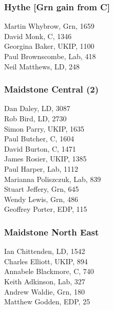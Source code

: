 \documentclass[a4paper,openany,10pt]{book}
\begin{document}
\subsubsection*{Hythe \hspace*{\fill}\nolinebreak[1]%
\enspace\hspace*{\fill}
[Grn gain from C]}



Martin Whybrow, Grn, 1659\\
David Monk, C, 1346\\
Georgina Baker, UKIP, 1100\\
Paul Brownscombe, Lab, 418\\
Neil Matthews, LD, 248\\


\subsubsection*{Maidstone Central (2)}



Dan Daley, LD, 3087\\
Rob Bird, LD, 2730\\
Simon Parry, UKIP, 1635\\
Paul Butcher, C, 1604\\
David Burton, C, 1471\\
James Rosier, UKIP, 1385\\
Paul Harper, Lab, 1112\\
Marianna Poliszczuk, Lab, 839\\
Stuart Jeffery, Grn, 645\\
Wendy Lewis, Grn, 486\\
Geoffrey Porter, EDP, 115\\


\subsubsection*{Maidstone North East}



Ian Chittenden, LD, 1542\\
Charles Elliott, UKIP, 894\\
Annabele Blackmore, C, 740\\
Keith Adkinson, Lab, 327\\
Andrew Waldie, Grn, 180\\
Matthew Godden, EDP, 25\\
\end{document}
